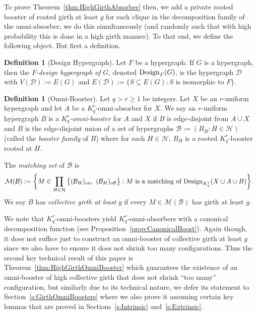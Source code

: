 \documentclass[11pt]{article}
\newcommand{\mc}[1]{\mathcal{#1}}
\newcounter{i}
\theoremstyle{plain}
\theoremstyle{plain} %
\theoremstyle{definition}
\newtheorem{definition}[thm]{Definition}
\begin{document}
To prove Theorem~\ref{thm:HighGirthAbsorber} then, we add a private rooted booster of rooted girth at least $g$ for each clique in the decomposition family of the omni-absorber; we do this simultaneously (and randomly such that with high probability this is done in a high girth manner). To that end, we define the following object. But first a definition.

\begin{definition}[Design Hypergraph]
Let $F$ be a hypergraph. If $G$ is a hypergraph, then the \emph{$F$-design hypergraph of $G$}, denoted ${\rm Design}_F(G)$, %
is the hypergraph $\mathcal{D}$ with $V(\mathcal{D}):=E(G)$ and $E(\mathcal{D}) := \{S\subseteq E(G): S \text{ is isomorphic to } F\}$.
\end{definition}

\begin{definition}[Omni-Booster]\label{def:OmniBooster}
Let $q > r\ge 1$ be integers. Let $X$ be an $r$-uniform hypergraph and let $A$ be a $K_q^r$-omni-absorber for $X$. We say an $r$-uniform hypergraph $B$ is a \emph{$K_q^r$-omni-booster} for $A$ and $X$ if $B$ is edge-disjoint from $A\cup X$ and $B$ is the edge-disjoint union of a set of hypergraphs $\mathcal{B}:= (B_H: H\in\mathcal{H})$ (called the \emph{booster family} of $B$) where for each $H\in \mathcal{H}$, $B_H$ is a rooted $K_q^r$-booster rooted at $H$.

The \emph{matching set} of $\mc{B}$ is 
$$\mc{M}(\mc{B}):= \bigg\{ M \in \prod_{H\in \mathcal{H}} \big\{ (\mathcal{B}_{H})_{{\rm on}},~ (\mathcal{B}_{H})_{{\rm off}} \big\} : M \text{ is a matching of } {\rm Design}_{K_q^r}(X\cup A\cup B)\bigg\}.$$
We say $B$ has \emph{collective girth at least $g$} if every $M\in \mc{M}(\mc{B})$ has girth at least $g$.
\end{definition}

We note that $K_q^r$-omni-boosters yield $K_q^r$-omni-absorbers with a canonical decomposition function (see Proposition~\ref{prop:CanonicalBoost}). Again though, it does not suffice just to construct an omni-booster of collective girth at least $g$ since we also have to ensure it does not shrink too many configurations. Thus the second key technical result of this paper is Theorem~\ref{thm:HighGirthOmniBooster} which guarantees the existence of an omni-booster of high collective girth that does not shrink ``too many'' configuration, but similarly due to its technical nature, we defer its statement to Section~\ref{s:GirthOmniBoosters} where we also prove it assuming certain key lemmas that are proved in Sections~\ref{s:Intrinsic} and~\ref{s:Extrinsic}.
\end{document}
